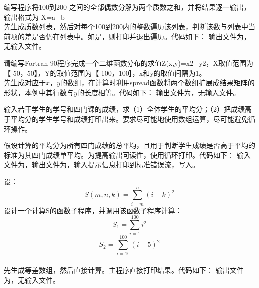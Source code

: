 \documentclass{ctexart}
\begin{document}
\maketitle

\begin{answer}

    编写程序将100到200 之间的全部偶数分解为两个质数之和，并将结果逐一输出，输出格式为 X=a+b\\

    先生成质数列表，然后对每个100到200内的整数遍历该列表，判断该数与列表中当前项的差是否仍在列表中。如是，则打印并退出遍历。代码如下：
    输出文件为，无输入文件。

    请编写Fortran 90程序完成一个二维函数分布的求值Z(x,y)=x2+y2，X取值范围为【-50，50】，Y的取值范围为【-100，100】，x和y的取值间隔为1。\\

    先生成对应于$x$，$y$的数组，在计算时利用spread函数将两个数组扩展成结果矩阵的形状，本例中其行数与$y$的长度相等。代码如下：
    输出文件为，无输入文件。

    输入若干学生的学号和四门课的成绩，求（1）全体学生的平均分；（2）把成绩高于平均分的学生学号和成绩打印出来。要求尽可能地使用数组运算，尽可能避免循环操作。

    假设计算的平均分为所有四门成绩的总平均，且用于判断学生成绩是否高于平均的标准为其四门成绩单平均。为提高输出可读性，使用循环打印。代码如下：
    输入文件为，输出文件为，输入提示信息打印到标准错误流，写入。

    设：\[S\left(m, n, k\right)=\sum_{i=m}^{n} \left(i-k\right)^2\]设计一个计算S的函数子程序，并调用该函数子程序计算：
    \[S_1=\sum_{i=1}^{100} i^2\]\[S_2=\sum_{i=10}^{100} \left(i-5\right)^2\]\\

    先生成等差数组，然后直接计算。主程序直接打印结果。代码如下：
    输出文件为，无输入文件。

\end{answer}
\end{document}
